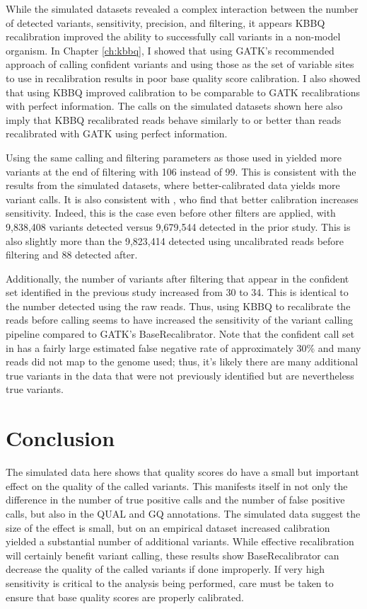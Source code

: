 While the simulated datasets revealed a complex interaction between the number of detected variants, sensitivity, precision, and filtering, it appears KBBQ recalibration improved the ability to successfully call variants in a non-model organism. In Chapter \ref{ch:kbbq}, I showed that using GATK's recommended approach of calling confident variants and using those as the set of variable sites to use in recalibration results in poor base quality score calibration. I also showed that using KBBQ improved calibration to be comparable to GATK recalibrations with perfect information. The calls on the simulated datasets shown here also imply that KBBQ recalibrated reads behave similarly to or better than reads recalibrated with GATK using perfect information.

Using the same calling and filtering parameters as those used in \textcite{orr_phylogenomic_2020} yielded more variants at the end of filtering with 106 instead of 99. This is consistent with the results from the simulated datasets, where better-calibrated data yields more variant calls. It is also consistent with \textcite{ni_improvement_2016}, who find that better calibration increases sensitivity. Indeed, this is the case even before other filters are applied, with 9,838,408 variants detected versus 9,679,544 detected in the prior study. This is also slightly more than the 9,823,414 detected using uncalibrated reads before filtering and 88 detected after.

Additionally, the number of variants after filtering that appear in the confident set identified in the previous study increased from 30 to 34. This is identical to the number detected using the raw reads. Thus, using KBBQ to recalibrate the reads before calling seems to have increased the sensitivity of the variant calling pipeline compared to GATK's BaseRecalibrator. Note that the confident call set in \textcite{orr_phylogenomic_2020} has a fairly large estimated false negative rate of approximately 30\% and many reads did not map to the genome used; thus, it's likely there are many additional true variants in the data that were not previously identified but are nevertheless true variants.

\section{Conclusion}

The simulated data here shows that quality scores do have a small but important effect on the quality of the called variants. This manifests itself in not only the difference in the number of true positive calls and the number of false positive calls, but also in the QUAL and GQ annotations. The simulated data suggest the size of the effect is small, but on an empirical dataset increased calibration yielded a substantial number of additional variants. While effective recalibration will certainly benefit variant calling, these results show BaseRecalibrator can decrease the quality of the called variants if done improperly. If very high sensitivity is critical to the analysis being performed, care must be taken to ensure that base quality scores are properly calibrated.

\printbibliography[segment=\therefsegment]{}
